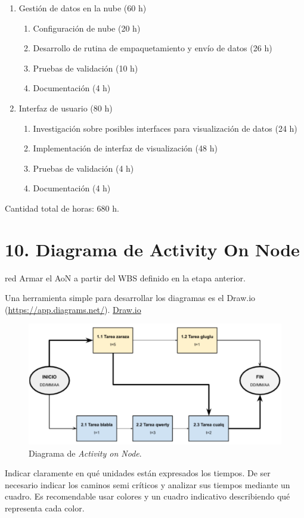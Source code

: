 \documentclass[
11pt, %
codirector, %
]{charter}
\begin{document}
\begin{enumerate}
\item Gestión de datos en la nube (60 h)
	\begin{enumerate}
	\item Configuración de nube (20 h)
	\item Desarrollo de rutina de empaquetamiento y envío de datos (26 h)
	\item Pruebas de validación (10 h)
	\item Documentación (4 h)
	\end{enumerate}	

\item Interfaz de usuario (80 h)
	\begin{enumerate}
	\item Investigación sobre posibles interfaces para visualización de datos (24 h)
	\item Implementación de interfaz de visualización (48 h)
	\item Pruebas de validación (4 h)
	\item Documentación (4 h)
	\end{enumerate}		
	
\end{enumerate}

Cantidad total de horas: 680 h.

\section{10. Diagrama de Activity On Node}
\label{sec:AoN}

\begin{consigna}{red}
Armar el AoN a partir del WBS definido en la etapa anterior.

Una herramienta simple para desarrollar los diagramas es el Draw.io (\url{https://app.diagrams.net/}).
\href{https://app.diagrams.net}{Draw.io}


\begin{figure}[htpb]
\centering 
\includegraphics[width=.8\textwidth]{./Figuras/AoN.png}
\caption{Diagrama de \textit{Activity on Node}.}
\label{fig:AoN}
\end{figure}

Indicar claramente en qué unidades están expresados los tiempos.
De ser necesario indicar los caminos semi críticos y analizar sus tiempos mediante un cuadro.
Es recomendable usar colores y un cuadro indicativo describiendo qué representa cada color.

\end{consigna}
\end{document}
